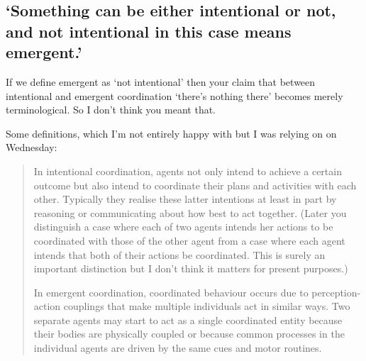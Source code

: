 \documentclass[12pt,\papersize]{extarticle}
\begin{document}
\setlength\footnotesep{1em}


\author{}
\date{}





\subsection{`Something  can be either intentional or not, and not intentional in this case means emergent.'}

If we define emergent as `not intentional' then your claim that between intentional and emergent coordination `there's nothing there' becomes merely terminological.  So I don't think you meant that.

Some definitions, which I'm not entirely happy with but I was relying on on Wednesday:
\begin{quote}
In intentional coordination, agents not only intend to achieve a certain outcome but also intend to coordinate their plans and activities with each other.  Typically they realise these latter intentions at least in part by reasoning or communicating about how best to act together.  (Later you distinguish a case where each of two agents intends her actions to be coordinated with those of the other agent from a case where each agent intends that both of their actions be coordinated.  This is surely an important distinction but I don't think it matters for present purposes.)

In emergent coordination, coordinated behaviour occurs due to perception-action couplings that make multiple individuals act in similar ways.  Two separate agents may start to act as a single coordinated entity because their bodies are physically coupled or because common processes in the individual agents are driven by the same cues and motor routines. 
\end{quote}
\end{document}
